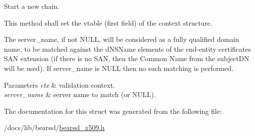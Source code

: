 Start a new chain. 

This method shall set the vtable (first field) of the context structure.

The {\ttfamily server\+\_\+name}, if not {\ttfamily N\+U\+LL}, will be considered as a fully qualified domain name, to be matched against the {\ttfamily d\+N\+S\+Name} elements of the end-\/entity certificate\textquotesingle{}s S\+AN extension (if there is no S\+AN, then the Common Name from the subject\+DN will be used). If {\ttfamily server\+\_\+name} is {\ttfamily N\+U\+LL} then no such matching is performed.


\begin{DoxyParams}{Parameters}
{\em ctx} & validation context. \\
\hline
{\em server\+\_\+name} & server name to match (or {\ttfamily N\+U\+LL}). \\
\hline
\end{DoxyParams}


The documentation for this struct was generated from the following file\+:\begin{DoxyCompactItemize}
\item 
/docs/lib/bearssl/\hyperlink{bearssl__x509_8h}{bearssl\+\_\+x509.\+h}\end{DoxyCompactItemize}
